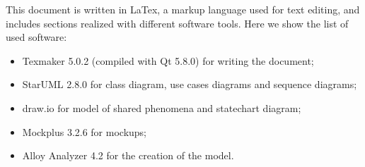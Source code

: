 This document is written in LaTex, a markup language used for text editing, and includes sections realized with different software tools. Here we show the list of used software:
\begin{itemize}
	\item Texmaker 5.0.2 (compiled with Qt 5.8.0) for writing the document;
	\item StarUML 2.8.0 for class diagram, use cases diagrams and sequence diagrams;
	\item draw.io for model of shared phenomena and statechart diagram;
	\item Mockplus 3.2.6 for mockups;
	\item Alloy Analyzer 4.2 for the creation of the model.	
\end{itemize}